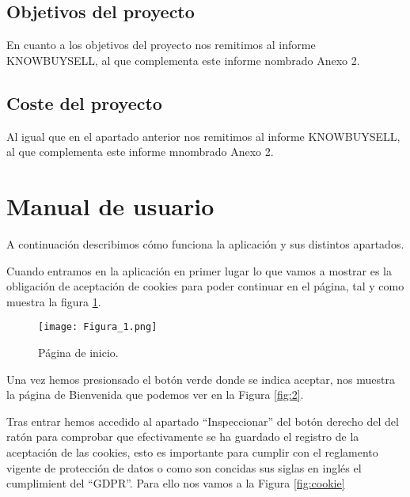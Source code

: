 \documentclass{article}
\begin{document}
\subsection{Objetivos del proyecto}
En cuanto a los objetivos del proyecto nos remitimos al informe KNOWBUYSELL, al que complementa este informe nombrado Anexo 2.
\subsection{Coste del proyecto}
Al igual que en el apartado anterior nos remitimos al informe KNOWBUYSELL, al que complementa este informe mnombrado Anexo 2.
\section{Manual de usuario}
A continuación describimos cómo funciona la aplicación y sus distintos apartados.

Cuando entramos en la aplicación en primer lugar lo que vamos a mostrar es la obligación de aceptación de cookies para poder continuar en el página, tal y como muestra la figura \ref{fig:1}.

\begin{figure}[h]
\centering
\texttt{[image: Figura\_1.png]}
\caption{\label{fig:1}Página de inicio.}
\end{figure}

Una vez hemos presionsado el botón verde donde se indica aceptar, nos muestra la página de Bienvenida que podemos ver en la Figura \ref{fig:2}.

Tras entrar hemos accedido al apartado ``Inspeccionar'' del botón derecho del del ratón para comprobar que efectivamente se ha guardado el registro de la aceptación de las cookies, esto es importante para cumplir con el reglamento vigente de protección de datos o como son concidas sus siglas en inglés el cumplimient del ``GDPR''. Para ello nos vamos a la Figura \ref{fig:cookie}
\end{document}
